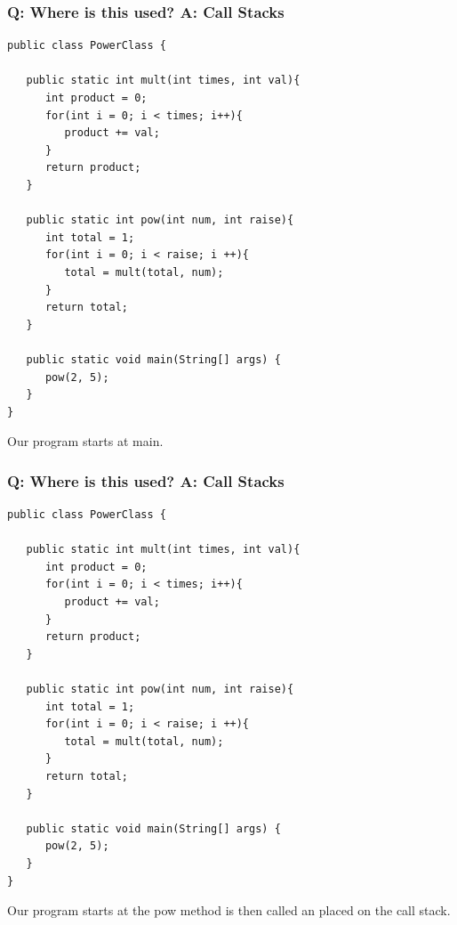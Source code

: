 \documentclass{beamer}
\begin{document}
\begin{frame}[fragile]
    \frametitle{Q: Where is this used? A: Call Stacks}
    \begin{minipage}{0.54\textwidth}
    \begin{lstlisting}[frame=trBL, basicstyle=\tiny]
public class PowerClass {
   
   public static int mult(int times, int val){
      int product = 0;
      for(int i = 0; i < times; i++){
         product += val;
      }
      return product;
   }
   
   public static int pow(int num, int raise){
      int total = 1;
      for(int i = 0; i < raise; i ++){
         total = mult(total, num);
      }
      return total;
   }
   
   public static void main(String[] args) {
      pow(2, 5);
   }
}
    \end{lstlisting}
    \end{minipage}
	\hfill
    \begin{minipage}{0.44\textwidth}
        \begin{drawstack}
        \end{drawstack}
    \end{minipage}
    \centering 
    Our program starts at main.
\end{frame}

\begin{frame}[fragile]
    \frametitle{Q: Where is this used? A: Call Stacks}
    \begin{minipage}{0.54\textwidth}
    \begin{lstlisting}[frame=trBL, basicstyle=\tiny]
public class PowerClass {
   
   public static int mult(int times, int val){
      int product = 0;
      for(int i = 0; i < times; i++){
         product += val;
      }
      return product;
   }
   
   public static int pow(int num, int raise){
      int total = 1;
      for(int i = 0; i < raise; i ++){
         total = mult(total, num);
      }
      return total;
   }
   
   public static void main(String[] args) {
      pow(2, 5);
   }
}
    \end{lstlisting}
    \end{minipage}
	\hfill
    \begin{minipage}{0.44\textwidth}
        \begin{drawstack}
        \end{drawstack}
    \end{minipage}
    \centering 
    Our program starts at the pow method is then called an placed on the call stack.
\end{frame}
\end{document}

